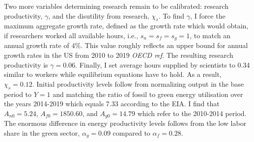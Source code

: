  Two more variables determining research remain to be calibrated: research productivity, $\gamma$, and the disutility from research, $\chi_s$.
 To find $\gamma$, I force the maximum aggregate growth rate, defined as the growth rate which would obtain, if researchers worked all available hours, i.e., $s_n=s_f=s_g=1$, to match an annual growth rate of $4\%$. This value roughly reflects an upper bound for annual growth rates in the US from 2010 to 2019 \textit{OECD ref}. The resulting research productivity is $\gamma = 0.06$.  Finally, I set average hours supplied by scientists to 0.34 similar to workers while equilibrium equations have to hold. As a result,  $\chi_s=0.12$. Initial productivity levels follow from normalizing output in the base period to $Y=1$ and matching the ratio of fossil to green energy utilisation over the years 2014-2019 which equals 7.33 according to the EIA. I find that $A_{n0}=5.24$, $A_{f0}=1850.60$, and $A_{g0}=14.79$ which refer to the 2010-2014 period. The enormous difference in energy productivity levels follows from the low labor share in the green sector, $\alpha_g=0.09$ compared to $\alpha_f= 0.28$. 
 \thispagestyle{empty}
